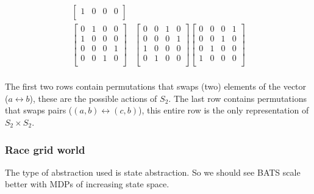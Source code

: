 \begin{align*}
\begin{bmatrix}
 1 & 0 & 0 & 0 \\
 \end{bmatrix}   \\
 \begin{bmatrix}
 0 & 1 & 0 & 0 \\
 1 & 0 & 0 & 0 \\
 0 & 0 & 0 & 1 \\
 0 & 0 & 1 & 0 \\
 \end{bmatrix}
 &\begin{bmatrix}
 0 & 0 & 1 & 0 \\
 0 & 0 & 0 & 1 \\
 1 & 0 & 0 & 0 \\
 0 & 1 & 0 & 0 \\
 \end{bmatrix}
 \begin{bmatrix}
 0 & 0 & 0 & 1 \\
 0 & 0 & 1 & 0 \\
 0 & 1 & 0 & 0 \\
 1 & 0 & 0 & 0 \\
 \end{bmatrix}   \\
\end{align*}

The first two rows contain permutations that swaps (two) elements of the vector ($a\leftrightarrow b$), these are the possible actions of $S_2$.
The last row contains permutations that swaps pairs ($(a, b) \leftrightarrow (c, b)$), this entire row is the only representation of $S_2 \times S_2$.

\subsubsection{Race grid world}\label{race-grid-world}

The type of abstraction used is state abstraction. So we should see BATS scale better with MDPs of increasing state space.

